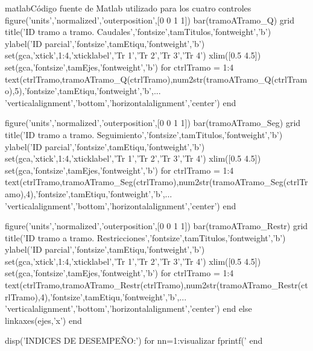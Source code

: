 \begin{anexo}
\begin{sourcecode}{matlab}{Código fuente de Matlab utilizado para los cuatro controles}
    figure('units','normalized','outerposition',[0 0 1 1])
    bar(tramoATramo_Q)
    grid
    title('ID tramo a tramo. Caudales','fontsize',tamTitulos,'fontweight','b')
    ylabel('ID parcial','fontsize',tamEtiqu,'fontweight','b')
    set(gca,'xtick',1:4,'xticklabel',{'Tr 1','Tr 2','Tr 3','Tr 4'})
    xlim([0.5 4.5])
    set(gca,'fontsize',tamEjes,'fontweight','b')
    for ctrlTramo = 1:4
        text(ctrlTramo,tramoATramo_Q(ctrlTramo),num2str(tramoATramo_Q(ctrlTramo),5),'fontsize',tamEtiqu,'fontweight','b',...
            'verticalalignment','bottom','horizontalalignment','center')
    end
    
    figure('units','normalized','outerposition',[0 0 1 1])
    bar(tramoATramo_Seg)
    grid
    title('ID tramo a tramo. Seguimiento','fontsize',tamTitulos,'fontweight','b')
    ylabel('ID parcial','fontsize',tamEtiqu,'fontweight','b')
    set(gca,'xtick',1:4,'xticklabel',{'Tr 1','Tr 2','Tr 3','Tr 4'})
    xlim([0.5 4.5])
    set(gca,'fontsize',tamEjes,'fontweight','b')
    for ctrlTramo = 1:4
        text(ctrlTramo,tramoATramo_Seg(ctrlTramo),num2str(tramoATramo_Seg(ctrlTramo),4),'fontsize',tamEtiqu,'fontweight','b',...
            'verticalalignment','bottom','horizontalalignment','center')
    end
    
    
    figure('units','normalized','outerposition',[0 0 1 1])
    bar(tramoATramo_Restr)
    grid
    title('ID tramo a tramo. Restricciones','fontsize',tamTitulos,'fontweight','b')
    ylabel('ID parcial','fontsize',tamEtiqu,'fontweight','b')
    set(gca,'xtick',1:4,'xticklabel',{'Tr 1','Tr 2','Tr 3','Tr 4'})
    xlim([0.5 4.5])
    set(gca,'fontsize',tamEjes,'fontweight','b')
    for ctrlTramo = 1:4
        text(ctrlTramo,tramoATramo_Restr(ctrlTramo),num2str(tramoATramo_Restr(ctrlTramo),4),'fontsize',tamEtiqu,'fontweight','b',...
            'verticalalignment','bottom','horizontalalignment','center')
    end
else
    linkaxes(ejes,'x')
end


disp('INDICES DE DESEMPEÑO:')
for nn=1:visualizar
    fprintf('%
end


\end{sourcecode}
		

\end{anexo}
